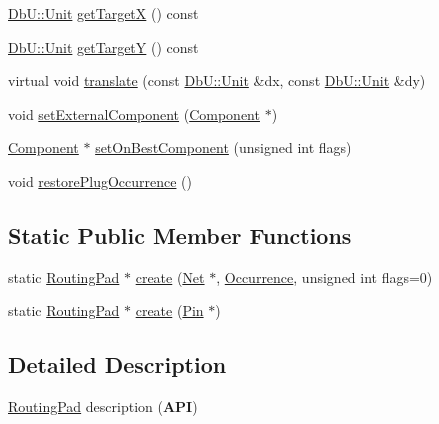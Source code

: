 \begin{DoxyCompactItemize}
\item 
\hyperlink{group__DbUGroup_ga4fbfa3e8c89347af76c9628ea06c4146}{Db\+U\+::\+Unit} \hyperlink{classHurricane_1_1RoutingPad_a3c0f5056b20515d308c2945ab692bce5}{get\+TargetX} () const
\item 
\hyperlink{group__DbUGroup_ga4fbfa3e8c89347af76c9628ea06c4146}{Db\+U\+::\+Unit} \hyperlink{classHurricane_1_1RoutingPad_a41a9c831d668377fc0c5e628f66465a0}{get\+TargetY} () const
\item 
virtual void \hyperlink{classHurricane_1_1RoutingPad_a41bf66ffda0c0ceaaebc67acd72d5b36}{translate} (const \hyperlink{group__DbUGroup_ga4fbfa3e8c89347af76c9628ea06c4146}{Db\+U\+::\+Unit} \&dx, const \hyperlink{group__DbUGroup_ga4fbfa3e8c89347af76c9628ea06c4146}{Db\+U\+::\+Unit} \&dy)
\item 
void \hyperlink{classHurricane_1_1RoutingPad_a9f448ad4f05f6995edc4a5ab50501586}{set\+External\+Component} (\hyperlink{classHurricane_1_1Component}{Component} $\ast$)
\item 
\hyperlink{classHurricane_1_1Component}{Component} $\ast$ \hyperlink{classHurricane_1_1RoutingPad_a410992ef75c40f9a898c36f39a7d1a1a}{set\+On\+Best\+Component} (unsigned int flags)
\item 
void \hyperlink{classHurricane_1_1RoutingPad_a1fcb0951f5f9505c6978bf498f78fce9}{restore\+Plug\+Occurrence} ()
\end{DoxyCompactItemize}
\subsection*{Static Public Member Functions}
\begin{DoxyCompactItemize}
\item 
static \hyperlink{classHurricane_1_1RoutingPad}{Routing\+Pad} $\ast$ \hyperlink{classHurricane_1_1RoutingPad_a87c3a286477f81b9c791dc24104a3e51}{create} (\hyperlink{classHurricane_1_1Net}{Net} $\ast$, \hyperlink{classHurricane_1_1Occurrence}{Occurrence}, unsigned int flags=0)
\item 
static \hyperlink{classHurricane_1_1RoutingPad}{Routing\+Pad} $\ast$ \hyperlink{classHurricane_1_1RoutingPad_a1883e5711b5700cd7d1024f1cff6abb0}{create} (\hyperlink{classHurricane_1_1Pin}{Pin} $\ast$)
\end{DoxyCompactItemize}


\subsection{Detailed Description}
\hyperlink{classHurricane_1_1RoutingPad}{Routing\+Pad} description ({\bfseries A\+PI}) 

